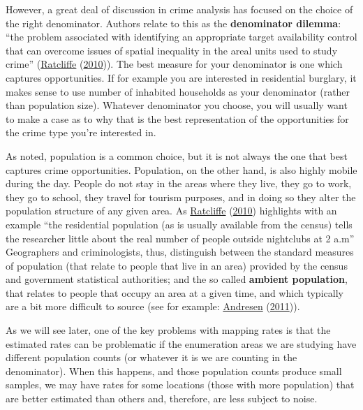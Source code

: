 \documentclass[
  krantz2]{krantz}
\begin{document}
However, a great deal of discussion in crime analysis has focused on the choice of the right denominator. Authors relate to this as the \textbf{denominator dilemma}: ``the problem associated with identifying an appropriate target availability control that can overcome issues of spatial inequality in the areal units used to study crime'' (\protect\hyperlink{ref-Ratcliffe_2010}{Ratcliffe} (\protect\hyperlink{ref-Ratcliffe_2010}{2010})). The best measure for your denominator is one which captures opportunities. If for example you are interested in residential burglary, it makes sense to use number of inhabited households as your denominator (rather than population size). Whatever denominator you choose, you will usually want to make a case as to why that is the best representation of the opportunities for the crime type you're interested in.

As noted, population is a common choice, but it is not always the one that best captures crime opportunities. Population, on the other hand, is also highly mobile during the day. People do not stay in the areas where they live, they go to work, they go to school, they travel for tourism purposes, and in doing so they alter the population structure of any given area. As \protect\hyperlink{ref-Ratcliffe_2010}{Ratcliffe} (\protect\hyperlink{ref-Ratcliffe_2010}{2010}) highlights with an example ``the residential population (as is usually available from the census) tells the researcher little about the real number of people outside nightclubs at 2 a.m'' Geographers and criminologists, thus, distinguish between the standard measures of population (that relate to people that live in an area) provided by the census and government statistical authorities; and the so called \textbf{ambient population}, that relates to people that occupy an area at a given time, and which typically are a bit more difficult to source (see for example: \protect\hyperlink{ref-Andresen_2011}{Andresen} (\protect\hyperlink{ref-Andresen_2011}{2011})).

As we will see later, one of the key problems with mapping rates is that the estimated rates can be problematic if the enumeration areas we are studying have different population counts (or whatever it is we are counting in the denominator). When this happens, and those population counts produce small samples, we may have rates for some locations (those with more population) that are better estimated than others and, therefore, are less subject to noise.
\end{document}
